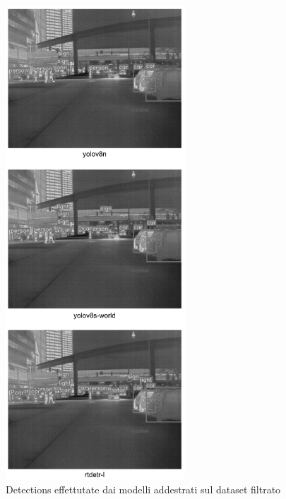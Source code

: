 \begin{figure}[ht]
    \centering
    \includegraphics[width=0.6\textwidth]{files/capitoli/4-sperimentazione-risultati/assets/filtered-data-detections.png}
    \caption{\label{fig:initial-detections}Detections effettutate dai modelli addestrati sul dataset filtrato}
\end{figure}

\clearpage